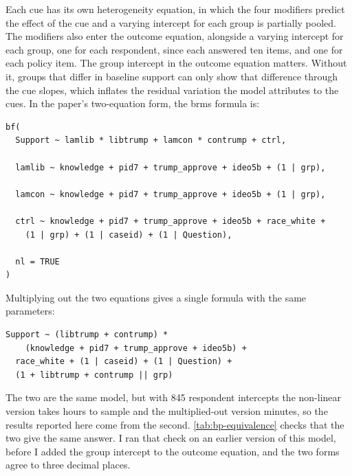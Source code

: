 \documentclass[12pt]{article}
\begin{document}
Each cue has its own heterogeneity equation, in which the four modifiers predict the effect of the cue and a varying intercept for each group is partially pooled.
The modifiers also enter the outcome equation, alongside a varying intercept for each group, one for each respondent, since each answered ten items, and one for each policy item.
The group intercept in the outcome equation matters.
Without it, groups that differ in baseline support can only show that difference through the cue slopes, which inflates the residual variation the model attributes to the cues.
In the paper's two-equation form, the brms formula is:

\begin{verbatim}
bf(
  Support ~ lamlib * libtrump + lamcon * contrump + ctrl,

  lamlib ~ knowledge + pid7 + trump_approve + ideo5b + (1 | grp),

  lamcon ~ knowledge + pid7 + trump_approve + ideo5b + (1 | grp),

  ctrl ~ knowledge + pid7 + trump_approve + ideo5b + race_white +
    (1 | grp) + (1 | caseid) + (1 | Question),

  nl = TRUE
)
\end{verbatim}

Multiplying out the two equations gives a single formula with the same parameters:

\begin{verbatim}
Support ~ (libtrump + contrump) *
    (knowledge + pid7 + trump_approve + ideo5b) +
  race_white + (1 | caseid) + (1 | Question) +
  (1 + libtrump + contrump || grp)
\end{verbatim}

The two are the same model, but with 845 respondent intercepts the non-linear version takes hours to sample and the multiplied-out version minutes, so the results reported here come from the second.
\autoref{tab:bp-equivalence} checks that the two give the same answer.
I ran that check on an earlier version of this model, before I added the group intercept to the outcome equation, and the two forms agree to three decimal places.
\end{document}
